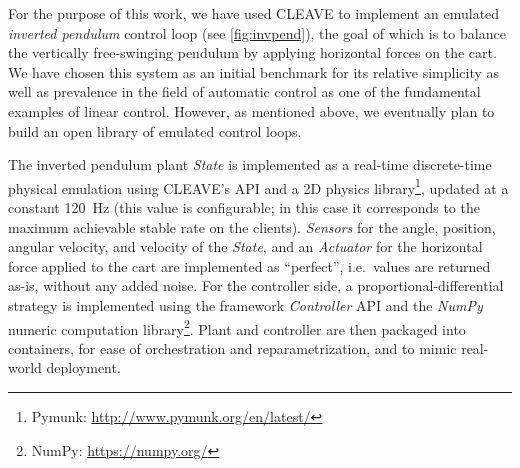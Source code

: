 For the purpose of this work, we have used \ac{CLEAVE} to implement an emulated \emph{inverted pendulum} control loop (see \cref{fig:invpend}), the goal of which is to balance the vertically free-swinging pendulum by applying horizontal forces on the cart.
We have chosen this system as an initial benchmark for its relative simplicity as well as prevalence in the field of automatic control as one of the fundamental examples of linear control.
However, as mentioned above, we eventually plan to build an open library of emulated control loops.  

The inverted pendulum plant \emph{State} is implemented as a real-time discrete-time physical emulation using CLEAVE's API and a 2D physics library\footnote{Pymunk: \url{http://www.pymunk.org/en/latest/}}, updated at a constant \SI{120}{\hertz} (this value is configurable; in this case it corresponds to the maximum achievable stable rate on the clients).
\emph{Sensors} for the angle, position, angular velocity, and velocity of the \emph{State}, and an \emph{Actuator} for the horizontal force applied to the cart are implemented as ``perfect'', i.e.\ values are returned as-is, without any added noise.
For the controller side, a proportional-differential strategy is implemented using the framework \emph{Controller} API and the \emph{NumPy} numeric computation library\footnote{NumPy: \url{https://numpy.org/}}.
Plant and controller are then packaged into containers, for ease of orchestration and reparametrization, and to mimic real-world deployment.
